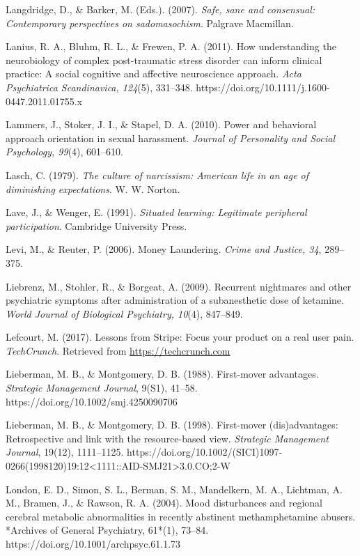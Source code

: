 \begin{thebibliography}{}

    Langdridge, D., \& Barker, M. (Eds.). (2007). \textit{Safe, sane and consensual: Contemporary perspectives on sadomasochism}. Palgrave Macmillan.

    Lanius, R. A., Bluhm, R. L., \& Frewen, P. A. (2011). How understanding the neurobiology of complex post-traumatic stress disorder can inform clinical practice: A social cognitive and affective neuroscience approach. \textit{Acta Psychiatrica Scandinavica, 124}(5), 331–348. https://doi.org/10.1111/j.1600-0447.2011.01755.x

    Lammers, J., Stoker, J. I., \& Stapel, D. A. (2010). Power and behavioral approach orientation in sexual harassment. \textit{Journal of Personality and Social Psychology, 99}(4), 601–610.

    Lasch, C. (1979). \textit{The culture of narcissism: American life in an age of diminishing expectations}. W. W. Norton.
    
    Lave, J., \& Wenger, E. (1991). \textit{Situated learning: Legitimate peripheral participation}. Cambridge University Press.

    Levi, M., \& Reuter, P. (2006). Money Laundering. \textit{Crime and Justice, 34}, 289–375.

    Liebrenz, M., Stohler, R., \& Borgeat, A. (2009). Recurrent nightmares and other psychiatric symptoms after administration of a subanesthetic dose of ketamine. \textit{World Journal of Biological Psychiatry, 10}(4), 847–849.

    Lefcourt, M. (2017). Lessons from Stripe: Focus your product on a real user pain. \textit{TechCrunch}. Retrieved from \url{https://techcrunch.com}

    Lieberman, M. B., \& Montgomery, D. B. (1988). First-mover advantages. \textit{Strategic Management Journal}, 9(S1), 41–58. https://doi.org/10.1002/smj.4250090706

    Lieberman, M. B., \& Montgomery, D. B. (1998). First-mover (dis)advantages: Retrospective and link with the resource-based view. \textit{Strategic Management Journal}, 19(12), 1111–1125. https://doi.org/10.1002/(SICI)1097-0266(1998120)19:12<1111::AID-SMJ21>3.0.CO;2-W

    London, E. D., Simon, S. L., Berman, S. M., Mandelkern, M. A., Lichtman, A. M., Bramen, J., \& Rawson, R. A. (2004). Mood disturbances and regional cerebral metabolic abnormalities in recently abstinent methamphetamine abusers. *Archives of General Psychiatry, 61*(1), 73–84. https://doi.org/10.1001/archpsyc.61.1.73


\end{thebibliography}
